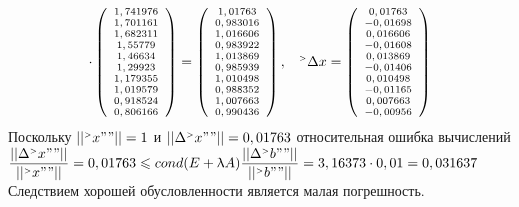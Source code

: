 \documentclass[12pt]{article}
\begin{document}
\begin{equation*}
	\scriptsize
	\cdot
	\left(
	\begin{array}{c}
		1,741976 \\ 1,701161 \\ 1,682311 \\ 1,55779 \\ 1,46634 \\ 1,29923 \\ 1,179355 \\ 1,019579 \\ 0,918524 \\ 0,806166
	\end{array}
	\right) = 
	\left(
	\begin{array}{c}
		1,01763 \\ 0,983016 \\ 1,016606 \\ 0,983922 \\ 1,013869 \\ 0,985939 \\ 1,010498 \\ 0,988352 \\ 1,007663 \\ 0,990436
	\end{array}
	\right) , \hspace{0.3cm}
	{}^{\mathsmaller{>}} \Delta x = 
	\left(
	\begin{array}{c}
		0,01763 \\ -0,01698 \\ 0,016606 \\ -0,01608 \\ 0,013869 \\ -0,01406 \\ 0,010498 \\ -0,01165 \\ 0,007663 \\ -0,00956
	\end{array}
	\right)
\end{equation*}
Поскольку $|| {}^{\mathsmaller{>}} x ""|| = 1 $
и 
$|| \Delta 	{}^{\mathsmaller{>}} x ""|| = 0,01763 $
относительная ошибка вычислений
$ \dfrac{|| \Delta 	{}^{\mathsmaller{>}} x ""||}{|| {}^{\mathsmaller{>}} x ""||}  =
0,01763 \leqslant cond(E + \uplambda A)
\dfrac{|| \Delta {}^{\mathsmaller{>}} b ""||}{|| {}^{\mathsmaller{>}} b ""||} =
3,16373 \cdot 0,01 = 0,031637	$ \\
Следствием хорошей обусловленности является малая погрешность.
\end{document}
